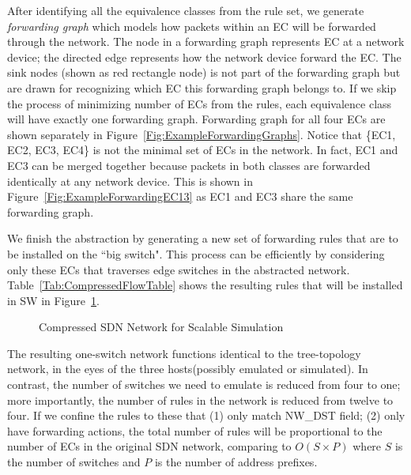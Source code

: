 After identifying all the equivalence classes from the rule set,
we generate \textit{forwarding graph} which models how packets within an EC will be
forwarded through the network\cite{Veriflow}.
The node in a forwarding graph represents EC at a network device;
the directed edge represents how the network device forward the EC.
The sink nodes (shown as red rectangle node) is not part of the forwarding graph
but are drawn for recognizing which EC this forwarding graph belongs to.
If we skip the process of minimizing number of ECs from the rules,
each equivalence class will have exactly one forwarding graph.
Forwarding graph for all four ECs are shown separately in
Figure~\ref{Fig:ExampleForwardingGraphs}.
Notice that \{EC1, EC2, EC3, EC4\} is not the minimal set of ECs in the network.
In fact, EC1 and EC3 can be merged together because packets in both classes are forwarded
identically at any network device.
This is shown in Figure~\ref{Fig:ExampleForwardingEC13} as EC1 and EC3 share the same
forwarding graph.

We finish the abstraction by generating a new set of forwarding rules that are to be
installed on the ``big switch".
This process can be efficiently by considering only these ECs that
traverses edge switches in the abstracted network.
Table~\ref{Tab:CompressedFlowTable} shows the resulting rules that will be installed in
SW in Figure~\ref{Fig:ExampleBigSwitch}.

\begin{figure}[t]
\centering
{}
\caption{Compressed SDN Network for Scalable Simulation}
\label{Fig:ExampleBigSwitch}
\end{figure}

The resulting one-switch network functions identical to the tree-topology network,
in the eyes of the three hosts(possibly emulated or simulated).
In contrast, the number of switches we need to emulate is reduced from four to one;
more importantly, the number of rules in the network is reduced from twelve to four.
If we confine the rules to these that (1) only match NW\_DST field;
(2) only have forwarding actions,
the total number of rules will be proportional to the number of ECs in the
original SDN network, comparing to $O(S\times P)$ where $S$ is the number of switches
and $P$ is the number of address prefixes.



